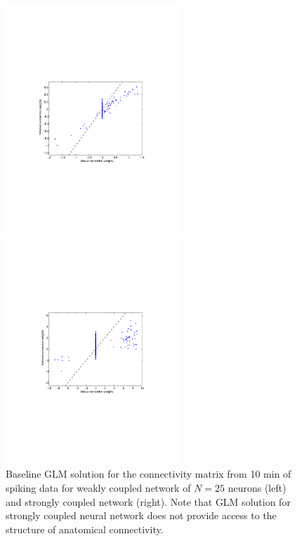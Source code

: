\documentclass[amsmath,amssymb]{revtex4}
\begin{document}
\begin{figure}
\centering
\begin{minipage}[c]{0.45\hsize}
\includegraphics[width=250px]{Figure8b_fluor_weak_glm}
\end{minipage}
\begin{minipage}[c]{0.45\hsize}
\includegraphics[width=250px]{Figure8a_fluor_strong_glm}
\end{minipage}
\caption{Baseline GLM solution for the connectivity matrix from 10 min of spiking data for weakly coupled network of $N=25$ neurons (left) and strongly coupled network (right). Note that GLM solution for strongly coupled neural network does not provide access to the structure of anatomical connectivity.}
\label{fig:strongcouple}
\end{figure}
\end{document}
